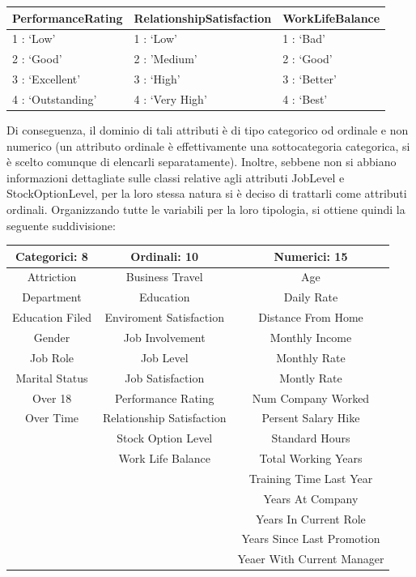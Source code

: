 \documentclass[a4paper,9pt]{article}
\begin{document}
\begin{center}
\begin{tabular}{l|l|l}
\hline
PerformanceRating & RelationshipSatisfaction&WorkLifeBalance \\
\hline
\hline
1 : `Low' & 1 : `Low' & 1 : `Bad'\\
2 : `Good' & 2 : 'Medium'& 2 : `Good'\\
3 : `Excellent'& 3 : `High' & 3 : `Better'\\
4 : `Outstanding'& 4 : `Very High' &4 : `Best'\\
\hline
\end{tabular}
\end{center}


Di conseguenza, il dominio di tali attributi è di tipo categorico od ordinale e non numerico (un attributo ordinale è effettivamente una sottocategoria categorica, si è scelto comunque di elencarli separatamente). Inoltre, sebbene non si abbiano informazioni dettagliate sulle classi relative agli attributi JobLevel e  StockOptionLevel, per la loro stessa natura si è deciso di trattarli come attributi ordinali. Organizzando tutte le variabili per la loro tipologia, si ottiene quindi la seguente suddivisione:

\begin{center}
\begin{tabular}{c|c|c}
\toprule
\bfseries Categorici: 8 &\bfseries Ordinali: 10 & \bfseries Numerici: 15 \\
\midrule
Attriction & Business Travel & Age \\
Department & Education & Daily Rate \\
Education Filed & Enviroment Satisfaction & Distance From Home \\
Gender & Job Involvement & Monthly Income \\
Job Role & Job Level & Monthly Rate\\
Marital Status & Job Satisfaction & Montly Rate\\
Over 18 & Performance Rating & Num Company Worked\\
Over Time & Relationship Satisfaction & Persent Salary Hike\\
& Stock Option Level & Standard Hours\\
& Work Life Balance & Total Working Years\\
& &Training Time Last Year\\
& & Years At Company\\
& & Years In Current Role\\
& & Years Since Last Promotion\\
& & Yeaer With Current Manager\\
\bottomrule 
\end{tabular}
\end{center}
\end{document}

